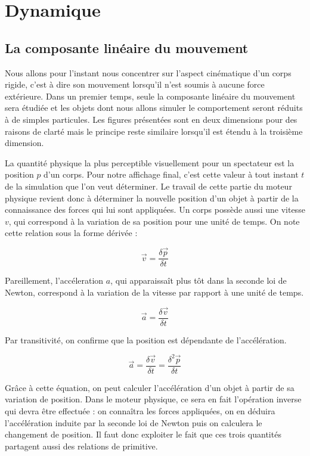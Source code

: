 \section{Dynamique} 

\subsection{La composante linéaire du mouvement}

Nous allons pour l'instant nous concentrer sur l'aspect cinématique d'un corps rigide, c'est à dire son mouvement lorsqu'il n'est soumis à aucune force extérieure. Dans un premier temps, seule la composante linéaire du mouvement sera étudiée et les objets dont nous allons simuler le comportement seront réduits à de simples particules. Les figures présentées sont en deux dimensions pour des raisons de clarté mais le principe reste similaire lorsqu'il est étendu à la troisième dimension.

La quantité physique la plus perceptible visuellement pour un spectateur est la position $p$ d'un corps. Pour notre affichage final, c'est cette valeur à tout instant $t$ de la simulation que l'on veut déterminer. Le travail de cette partie du moteur physique revient donc à déterminer la nouvelle position d'un objet à partir de la connaissance des forces qui lui sont appliquées. Un corps possède aussi une vitesse $v$, qui correspond à la variation de sa position pour une unité de temps. On note cette relation sous la forme dérivée :

\[\vec{v} = \frac{\delta \vec{p}}{\delta t}\]

Pareillement, l'accéleration $a$, qui apparaissaît plus tôt dans la seconde loi de Newton, correspond à la variation de la vitesse par rapport à une unité de temps.

\[\vec{a} = \frac{\delta \vec{v}}{\delta t}\]

Par transitivité, on confirme que la position est dépendante de l'accélération.

\[\vec{a} = \frac{\delta \vec{v}}{\delta t} = \frac{\delta^2 \vec{p}}{\delta t}\]

Grâce à cette équation, on peut calculer l'accélération d'un objet à partir de sa variation de position. Dans le moteur physique, ce sera en fait l'opération inverse qui devra être effectuée : on connaîtra les forces appliquées, on en déduira l'accélération induite par la seconde loi de Newton puis on calculera le changement de position. Il faut donc exploiter le fait que ces trois quantités partagent aussi des relations de primitive.

